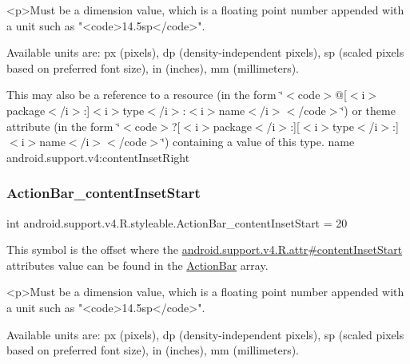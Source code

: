 \begin{DoxyVerb}      <p>Must be a dimension value, which is a floating point number appended with a unit such as "<code>14.5sp</code>".
\end{DoxyVerb}
 Available units are\+: px (pixels), dp (density-\/independent pixels), sp (scaled pixels based on preferred font size), in (inches), mm (millimeters). 

This may also be a reference to a resource (in the form \char`\"{}$<$code$>$@\mbox{[}$<$i$>$package$<$/i$>$\+:\mbox{]}$<$i$>$type$<$/i$>$\+:$<$i$>$name$<$/i$>$$<$/code$>$\char`\"{}) or theme attribute (in the form \char`\"{}$<$code$>$?\mbox{[}$<$i$>$package$<$/i$>$\+:\mbox{]}\mbox{[}$<$i$>$type$<$/i$>$\+:\mbox{]}$<$i$>$name$<$/i$>$$<$/code$>$\char`\"{}) containing a value of this type.  name android.\+support.\+v4\+:content\+Inset\+Right \mbox{\label{classandroid_1_1support_1_1v4_1_1R_1_1styleable_a8c36e247399bd81da6f4808194dd4df8}} 
\subsubsection{\texorpdfstring{Action\+Bar\+\_\+content\+Inset\+Start}{ActionBar\_contentInsetStart}}
{\footnotesize\ttfamily int android.\+support.\+v4.\+R.\+styleable.\+Action\+Bar\+\_\+content\+Inset\+Start = 20\hspace{0.3cm}{\ttfamily [static]}}

This symbol is the offset where the \hyperlink{classandroid_1_1support_1_1v4_1_1R_1_1attr_a271705b242fb5e101f893f6821b0149f}{android.\+support.\+v4.\+R.\+attr\#content\+Inset\+Start} attribute\textquotesingle{}s value can be found in the \hyperlink{classandroid_1_1support_1_1v4_1_1R_1_1styleable_adc5a3492b9c46265760d7120a04d6afa}{Action\+Bar} array.

\begin{DoxyVerb}      <p>Must be a dimension value, which is a floating point number appended with a unit such as "<code>14.5sp</code>".
\end{DoxyVerb}
 Available units are\+: px (pixels), dp (density-\/independent pixels), sp (scaled pixels based on preferred font size), in (inches), mm (millimeters). 

